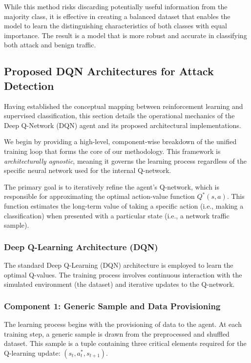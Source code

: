 \documentclass{report}
\begin{document}
While this method risks discarding potentially useful information from the majority class, it is effective in creating a balanced dataset that enables the model to learn the distinguishing characteristics of both classes with equal importance. The result is a model that is more robust and accurate in classifying both attack and benign traffic.

\subsection{Proposed DQN Architectures for Attack Detection}

Having established the conceptual mapping between reinforcement learning and supervised classification, this section details the operational mechanics of the Deep Q-Network (DQN) agent and its proposed architectural implementations.

We begin by providing a high-level, component-wise breakdown of the unified training loop that forms the core of our methodology. This framework is \textit{architecturally agnostic}, meaning it governs the learning process regardless of the specific neural network used for the internal Q-network.

The primary goal is to iteratively refine the agent’s Q-network, which is responsible for approximating the optimal action-value function \( Q^*(s, a) \). This function estimates the long-term value of taking a specific action (i.e., making a classification) when presented with a particular state (i.e., a network traffic sample).

\subsubsection{Deep Q-Learning Architecture (DQN)}

The standard Deep Q-Learning (DQN) architecture is employed to learn the optimal Q-values. The training process involves continuous interaction with the simulated environment (the dataset) and iterative updates to the Q-network.

\subsubsection*{Component 1: Generic Sample and Data Provisioning}

The learning process begins with the provisioning of data to the agent. At each training step, a generic sample is drawn from the preprocessed and shuffled dataset. This sample is a tuple containing three critical elements required for the Q-learning update: \( (s_t, a^*_t, s_{t+1}) \).
\end{document}
